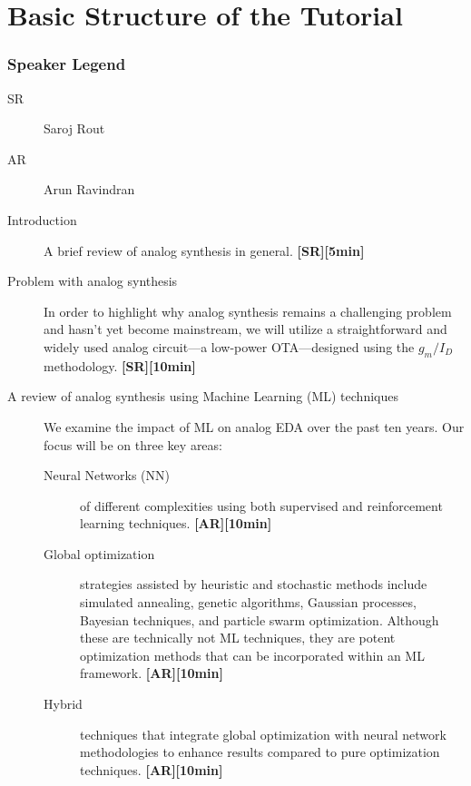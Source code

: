 \documentclass[12pt]{article}
\begin{document}
\pagebreak
\section*{Basic Structure of the Tutorial}

\subsubsection*{Speaker Legend}
\begin{description}
    \item[SR] Saroj Rout
    \item[AR] Arun Ravindran
\end{description}

\begin{description}
    \item[Introduction] A brief review of analog synthesis in general. \textbf{[SR][5min]}
    
    \item[Problem with analog synthesis]  In order to highlight why analog synthesis remains a challenging problem and hasn't yet become mainstream, we will utilize a straightforward and widely used analog circuit—a low-power OTA—designed using the $g_m/I_D$ methodology. \textbf{[SR][10min]}

    \item[A review of analog synthesis using Machine Learning (ML) techniques] We examine the impact of ML on analog EDA over the past ten years. Our focus will be on three key areas:
    \begin{description}
        \item[Neural Networks (NN)] of different complexities using both supervised and reinforcement learning techniques. \textbf{[AR][10min]}
        \item[Global optimization] strategies assisted by heuristic and stochastic methods include simulated annealing, genetic algorithms, Gaussian processes, Bayesian techniques, and particle swarm optimization. Although these are technically not ML techniques, they are potent optimization methods that can be incorporated within an ML framework. \textbf{[AR][10min] }
        \item[Hybrid] techniques that integrate global optimization with neural network methodologies to enhance results compared to pure optimization techniques. \textbf{[AR][10min]}
    \end{description}


\end{description}
\end{document}
